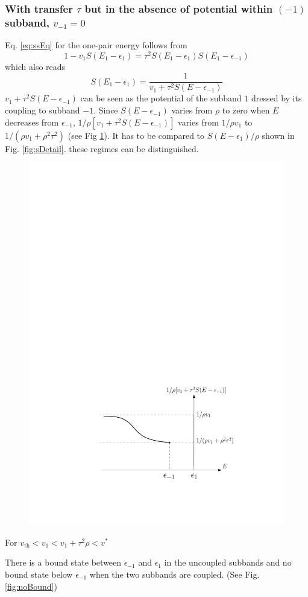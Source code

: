 \documentclass[11pt]{article} %
\begin{document}
\subsubsection{With transfer $\tau$ but in the absence of potential within $(-1)$ subband, $v_{-1}=0$}
Eq.  \ref{eq:ssEq} for the one-pair energy follows from 
\begin{equation}
1-v_{1}S(E_1-\epsilon_{1})
=\tau^2S(E_1-\epsilon_{1})S(E_1-\epsilon_{-1})
\end{equation}
which also reads
\begin{equation}
S(E_1-\epsilon_{1})=\frac{1}{v_{1}+\tau^{2}S(E-\epsilon_{-1})}
\end{equation}
${v_{1}+\tau^{2}S(E-\epsilon_{-1})}$ can be seen as the potential of the subband $1$ dressed by its coupling to subband $-1$.  Since $S(E-\epsilon_{-1})$ varies from $\rho$ to zero when $E$ decreases from $\epsilon_{-1}$, ${1}/{\rho{}[v_{1}+\tau^{2}S(E-\epsilon_{-1})]}$ varies from $1/\rho{}v_{1}$ to $1/(\rho{}v_{1}+\rho^{2}\tau^{2})$ (see Fig \ref{fig:1rhov}). It has to be compared to $S(E-\epsilon_{1})/\rho$ shown in Fig. \ref{fig:sDetail}.  these regimes can be distinguished.  
\begin{figure}[htb]
	\centering
	       \includegraphics[width=.6\textwidth]{1rhov}
			\caption{ \label{fig:1rhov}}
\end{figure}

For $v_{\text{th}}<v_1<v_1+\tau^2\rho<v^{*}$

There is a bound state between $\epsilon_{-1}$ and $\epsilon_1$ in the uncoupled subbands and no bound state below $\epsilon_{-1}$ when the two subbands are coupled.  (See Fig. \ref{fig:noBound})
\end{document}
